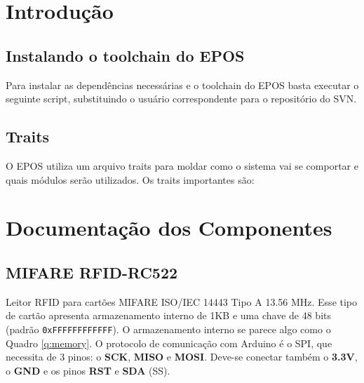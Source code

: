 \documentclass[11pt]{article}
\begin{document}


\section{Introdução}

\subsection{Instalando o toolchain do EPOS}

Para instalar as dependências necessárias e o toolchain do EPOS basta executar o seguinte script, substituindo o usuário correspondente para o repositório do SVN.



\subsection{Traits}

O EPOS utiliza um arquivo traits para moldar como o sistema vai se comportar e quais módulos serão utilizados. Os traits importantes são:






\section{Documentação dos Componentes}

\subsection{MIFARE RFID-RC522}

Leitor RFID para cartões MIFARE ISO/IEC 14443 Tipo A 13.56 MHz. Esse tipo de cartão apresenta armazenamento interno de 1KB e uma chave de 48 bits (padrão \texttt{0xFFFFFFFFFFFF}). O armazenamento interno se parece algo como o Quadro \ref{q:memory}. O protocolo de comunicação com Arduino é o SPI, que necessita de 3 pinos: o \textbf{SCK}, \textbf{MISO} e \textbf{MOSI}. Deve-se conectar também o \textbf{3.3V}, o \textbf{GND} e os pinos \textbf{RST} e \textbf{SDA} (SS).
\end{document}
